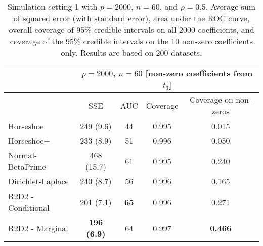 \documentclass[12pt]{article}
\begin{document}
\begin{table}[htbp]
	\centering
	\renewcommand{\arraystretch}{1.2}
	\begin{tabular}{|l|c|c|c|c|}
		\hline
		& \multicolumn{4}{c|}{$p = 2000$, $n = 60$ [non-zero coefficients from $t_3$]} \\
		\hline
		& SSE & AUC & Coverage & Coverage on non-zeros\\
		\hline
		Horseshoe & 249 (9.6) & 44 & 0.995 & 0.015 \\
		\hline
		Horseshoe+& 233 (8.9) & 51 & 0.996 & 0.050 \\
		\hline
		Normal-BetaPrime & 468 (15.7) & 61 & 0.995 & 0.240 \\
		\hline
		Dirichlet-Laplace & 240 (8.7) & 56 & 0.996 & 0.165 \\
		\hline
		R2D2 - Conditional & 201 (7.1) & \textbf{65} & 0.996 & 0.271 \\
		\hline
		R2D2 - Marginal & \textbf{196 (6.9)} & 64 & 0.997 & \textbf{0.466} \\
		\hline
	\end{tabular}
	\caption{\normalsize Simulation setting 1 with $p = 2000$, $n = 60$, and $\rho = 0.5$. Average sum of squared error (with standard error), area under the ROC curve, overall coverage of 95\% credible intervals on all 2000 coefficients, and coverage of the 95\% credible intervals on the 10 non-zero coefficients only. Results are based on 200 datasets.}
	\label{table-largep}
\end{table}










\end{document}
